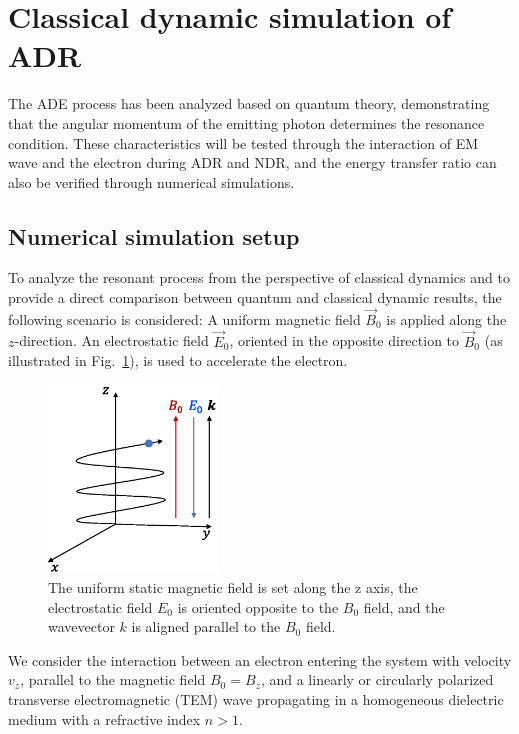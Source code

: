 \documentclass{cpbtex3}
\begin{document}
\section{Classical dynamic simulation of ADR}\label{sec:level3}
The ADE process has been analyzed based on quantum theory, demonstrating that the angular momentum of the emitting photon determines the resonance condition.  These characteristics will be tested through the interaction of EM wave and the electron during ADR and NDR, and the energy transfer ratio can also be verified through numerical simulations.
\subsection{Numerical simulation setup}
To analyze the resonant process from the perspective of classical dynamics and to provide a direct comparison between quantum and classical dynamic results, the following scenario is considered: A uniform magnetic field \( \vec{B}_0 \) is applied along the \( z \)-direction. An electrostatic field \( \vec{E}_0 \), oriented in the opposite direction to \( \vec{B}_0 \) (as illustrated in Fig.~\ref{fig:Setup}), is used to accelerate the electron. 
\begin{figure}
\centering
\includegraphics[width=0.4\textwidth]{Figure4.eps}%
\caption{\label{fig:Setup}The uniform static magnetic field is set along the z axis, the electrostatic field $E_0$ is oriented opposite to the $B_0$ field, and the wavevector $k$ is aligned parallel to the $B_0$ field.}
\end{figure}
We consider the interaction between an electron entering the system with velocity \( v_z \), parallel to the magnetic field \( B_0 = B_z \), and a linearly or circularly polarized transverse electromagnetic (TEM) wave propagating in a homogeneous dielectric medium with a refractive index \( n > 1 \).
\end{document}
